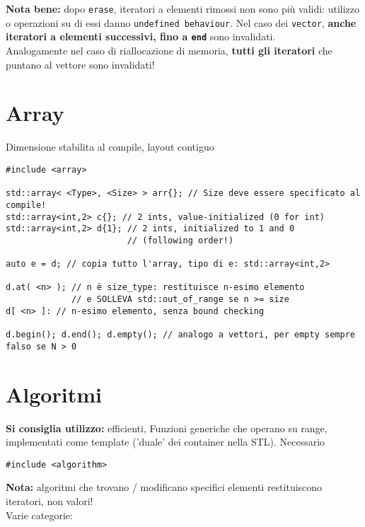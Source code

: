 \documentclass[10pt, oneside]{Book}
\begin{document}
\textbf{Nota bene: }dopo \texttt{erase}, iteratori a elementi rimossi non sono più validi: utilizzo o operazioni su di essi danno \texttt{undefined behaviour}. Nel caso dei \texttt{vector}, \textbf{anche iteratori a elementi successivi, fino a \texttt{end}} sono invalidati.
\\Analogamente nel caso di riallocazione di memoria, \textbf{tutti gli iteratori} che puntano al vettore sono invalidati!

\section{Array}
Dimensione stabilita al compile, layout contiguo
\begin{verbatim}
#include <array>

std::array< <Type>, <Size> > arr{}; // Size deve essere specificato al compile!
std::array<int,2> c{}; // 2 ints, value-initialized (0 for int)
std::array<int,2> d{1}; // 2 ints, initialized to 1 and 0 
                        // (following order!)
                        
auto e = d; // copia tutto l'array, tipo di e: std::array<int,2>

d.at( <n> ); // n è size_type: restituisce n-esimo elemento
             // e SOLLEVA std::out_of_range se n >= size
d[ <n> ]: // n-esimo elemento, senza bound checking

d.begin(); d.end(); d.empty(); // analogo a vettori, per empty sempre falso se N > 0
\end{verbatim}

\section{Algoritmi}
\textbf{Si consiglia utilizzo:} efficienti,
Funzioni generiche che operano su range, implementati come template ('duale' dei container nella STL). Necessario
\begin{verbatim}
#include <algorithm>
\end{verbatim}
\textbf{Nota:} algoritmi che trovano / modificano specifici elementi restituiscono iteratori, non valori!
\\Varie categorie:
\end{document}
